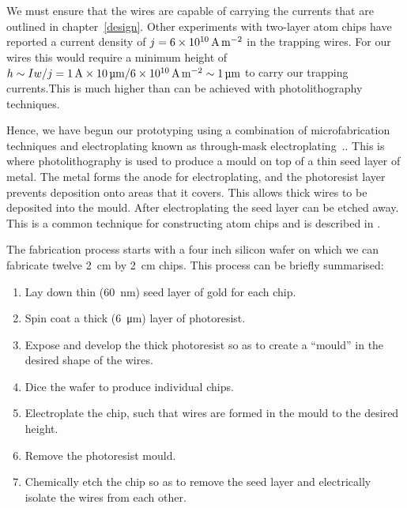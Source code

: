 We must ensure that the wires are capable of carrying the currents that are
outlined in chapter~\ref{design}.  Other experiments with two-layer atom chips
have reported a current density of $j=\SI{6E10}{\ampere\per\meter\squared}$ in
the trapping wires. For our wires this would require a minimum height of $h
\sim I w/j = \SI{1}{\ampere} \times
\SI{10}{\micro\meter}/\SI{6E10}{\ampere\per\meter\squared} \sim
\SI{1}{\micro\meter}$  to carry our trapping currents.This is much higher than
can be achieved with photolithography techniques.

Hence, we have begun our prototyping using a combination of microfabrication
techniques and electroplating known as through-mask
electroplating~\cite{Ruythooren_2000}.. This is where photolithography is used
to produce a mould on top of a thin seed layer of metal. The metal forms the
anode for electroplating, and the photoresist layer prevents deposition onto
areas that it covers. This allows thick wires to be deposited into the mould.
After electroplating the seed layer can be etched away.  This is a common
technique for constructing atom chips and is described in . 

The fabrication process starts with a four inch silicon wafer on which we can
fabricate twelve \SI{2}{\centi\meter} by \SI{2}{\centi\meter}  chips. This
process can be briefly summarised:
\begin{enumerate}
\item Lay down thin (\SI{60}{\nano\meter}) seed layer of gold for each chip.
\item Spin coat a thick (\SI{6}{\micro\meter}) layer of photoresist.
\item Expose and develop the thick photoresist so as to create a ``mould''
in the desired shape of the wires.
\item Dice the wafer to produce individual chips.
\item Electroplate the chip, such that wires are formed in the mould to the
desired height.
\item Remove the photoresist mould.
\item Chemically etch the chip so as to remove the seed layer and
  electrically isolate the wires from each other.
\end{enumerate}
%


